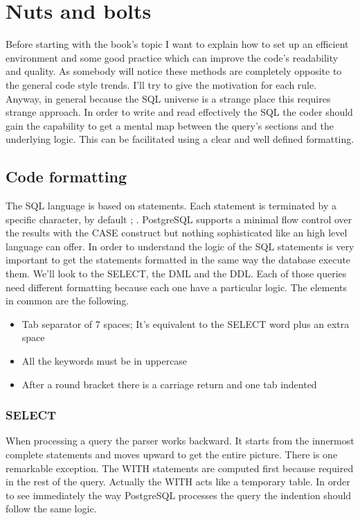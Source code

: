 \chapter{Nuts and bolts}
Before starting with the book's topic I want to explain how to set up an
efficient environment and some good practice which can improve the code's readability and quality.
As somebody will notice these methods are completely opposite to the general code style trends. I'll 
try to give the motivation for each rule. Anyway, in general because the SQL universe is a strange 
place this requires strange approach. In order to write and read effectively the SQL the coder should gain 
the capability to get a mental map  between the query's sections and the underlying logic. This can be 
facilitated using a clear and well defined formatting.\newline

\section{Code formatting}
The SQL language is based on statements. Each statement is terminated by a specific character, by default ; . PostgreSQL 
supports a minimal flow control over the results with the CASE construct but nothing sophisticated like an high level 
language can offer. In order to understand the logic of the SQL statements is very important to get the statements 
formatted in the same way the database execute them. We'll look to the SELECT, the DML and the DDL. Each of those 
queries need different formatting because each one have a particular logic. The elements in common are the following.

\begin{itemize}
 \item Tab separator of 7 spaces; It's equivalent to the SELECT word plus an extra space
 \item All the keywords must be in uppercase
 \item After a round bracket there is a carriage return and one tab indented 
\end{itemize}



\subsection{SELECT}
When processing a query the parser works backward. It starts from the innermost complete statements and moves upward to 
get the entire picture. There is one remarkable exception. The WITH statements are computed first because required in 
the rest of the query. Actually the WITH acts like a temporary table. In order to see immediately the way PostgreSQL 
processes the query the indention should follow the same logic. 






